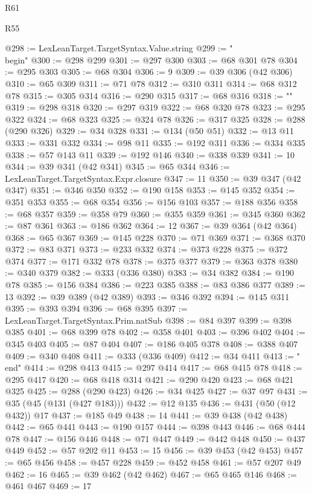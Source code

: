 \begin{lexlean}{R61}
\begin{lexlean}{R55}
\begin{coremodule}
{{{{{{{{{{{{{{{{{{{{{{{{{{{{{{{{{{{{{{{{{{{{{{{{{{{{{{{{{{{{@298 := LexLeanTarget.TargetSyntax.Value.string
@299 := "\\begin{"
@300 := @298 @299
@301 := @297 @300
@303 := @68 @301 @78
@304 := @295 @303
@305 := @68 @304
@306 := 9
@309 := @39 @306 (@42 @306)
@310 := @65 @309
@311 := @71 @78
@312 := @310 @311
@314 := @68 @312 @78
@315 := @305 @314
@316 := @290 @315
@317 := @68 @316
@318 := "}"
@319 := @298 @318
@320 := @297 @319
@322 := @68 @320 @78
@323 := @295 @322
@324 := @68 @323
@325 := @324 @78
@326 := @317 @325
@328 := @288 (@290 @326)
@329 := @34 @328
@331 := @134 (@50 @51)
@332 := @13 @11
@333 := @331 @332
@334 := @98 @11
@335 := @192 @311
@336 := @334 @335
@338 := @57 @143 @11
@339 := @192 @146
@340 := @338 @339
@341 := 10
@344 := @39 @341 (@42 @341)
@345 := @65 @344
@346 := LexLeanTarget.TargetSyntax.Expr.closure
@347 := 11
@350 := @39 @347 (@42 @347)
@351 := @346 @350
@352 := @190 @158
@353 := @145 @352
@354 := @351 @353
@355 := @68 @354
@356 := @156 @103
@357 := @188 @356
@358 := @68 @357
@359 := @358 @79
@360 := @355 @359
@361 := @345 @360
@362 := @87 @361
@363 := @186 @362
@364 := 12
@367 := @39 @364 (@42 @364)
@368 := @65 @367
@369 := @145 @228
@370 := @71 @369
@371 := @368 @370
@372 := @83 @371
@373 := @233 @332
@374 := @373 @228
@375 := @372 @374
@377 := @171 @332 @78
@378 := @375 @377
@379 := @363 @378
@380 := @340 @379
@382 := @333 (@336 @380)
@383 := @34 @382
@384 := @190 @78
@385 := @156 @384
@386 := @223 @385
@388 := @83 @386 @377
@389 := 13
@392 := @39 @389 (@42 @389)
@393 := @346 @392
@394 := @145 @311
@395 := @393 @394
@396 := @68 @395
@397 := LexLeanTarget.TargetSyntax.Prim.natSub
@398 := @84 @397
@399 := @398 @385
@401 := @68 @399 @78
@402 := @358 @401
@403 := @396 @402
@404 := @345 @403
@405 := @87 @404
@407 := @186 @405 @378
@408 := @388 @407
@409 := @340 @408
@411 := @333 (@336 @409)
@412 := @34 @411
@413 := "\\end{"
@414 := @298 @413
@415 := @297 @414
@417 := @68 @415 @78
@418 := @295 @417
@420 := @68 @418 @314
@421 := @290 @420
@423 := @68 @421 @325
@425 := @288 (@290 @423)
@426 := @34 @425
@427 := @37 @97
@431 := @35 (@45 (@131 (@427 @183)))
@432 := @12 @135
@436 := @431 (@50 (@12 @432)) @17
@437 := @185 @49
@438 := 14
@441 := @39 @438 (@42 @438)
@442 := @65 @441
@443 := @190 @157
@444 := @398 @443
@446 := @68 @444 @78
@447 := @156 @446
@448 := @71 @447
@449 := @442 @448
@450 := @437 @449
@452 := @57 @202 @11
@453 := 15
@456 := @39 @453 (@42 @453)
@457 := @65 @456
@458 := @457 @228
@459 := @452 @458
@461 := @57 @207 @49
@462 := 16
@465 := @39 @462 (@42 @462)
@467 := @65 @465 @146
@468 := @461 @467
@469 := 17
}}}}}}}}}}}}}}}}}}}}}}}}}}}}}}}}}}}}}}}}}}}}}}}}}}}}}}}}}}}}}
\end{coremodule}
\end{lexlean}
\end{lexlean}
